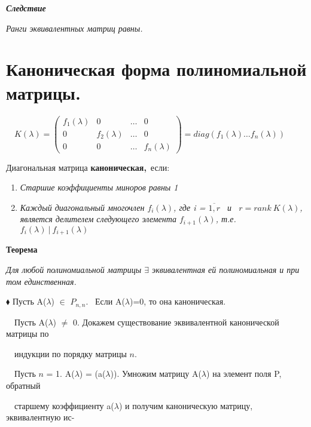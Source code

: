 \documentclass[a4paper, 12pt]{report}
\begin{document}
	\par\bigskip
	\textit{\textbf{Следствие}}
	
	\textit{Ранги эквивалентных матриц равны.}
	
	
	
	
	
	
	
	
	
	
	
	
	\section{Каноническая форма полиномиальной матрицы.}
	
	$\quad K(\lambda ) = \begin{pmatrix} f_1(\lambda) & 0 & \dots & 0 \\ 0 & f_2(\lambda) & \dots & 0 \\ 0 & 0 & \dots & f_n(\lambda) \end{pmatrix} = diag(f_1(\lambda) \dots f_n(\lambda)) $
	
	\par\bigskip
	Диагональная матрица {\textbf{каноническая,}}\ если:
	\begin{enumerate}
		\item  \textit{Старшие коэффициенты миноров равны 1}
		
		\item  \textit{Каждый диагональный многочлен $f_i(\lambda)$, где i = $\overline{1, r}$ \ и \ $r = rank \ K(\lambda)$, является делителем следующего элемента $f_{i+1}(\lambda)$, т.е. $f_i(\lambda)\ |\ f_{i+1}(\lambda)$}
	\end{enumerate}
	
	\par\bigskip
	\textbf{Теорема}
	
	\textit{Для любой полиномиальной матрицы $\exists$ эквивалентная ей полиномиальная и при том единственная.}
	\par\bigskip
	$\blacklozenge$ Пусть A($\lambda$) $\in$ $P_{n,n}$. \ Если A($\lambda$)=0, то она каноническая.
	\par\bigskip
	$\quad$Пусть A($\lambda$) $\not=$ 0. Докажем существование эквивалентной канонической матрицы по 
	
	$\quad$индукции по порядку матрицы $n$.
	\par\bigskip
	$\quad$Пусть $n$ = 1. A($\lambda$) = (a($\lambda$)). Умножим матрицу A($\lambda$) на элемент поля P, обратный
	
	$\quad$старшему коэффициенту a($\lambda$) и получим каноническую матрицу, эквивалентную ис-
	
\end{document}
